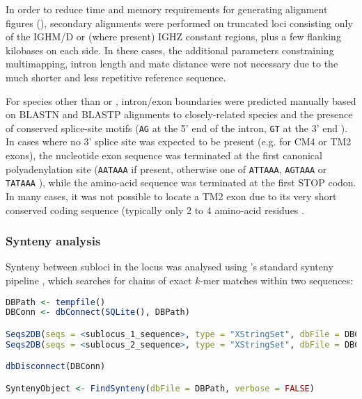 In order to reduce time and memory requirements for generating alignment figures (), secondary alignments were performed on truncated loci consisting only of the IGHM/D or (where present) IGHZ constant regions, plus a few flanking kilobases on each side. In these cases, the additional parameters constraining multimapping, intron length and mate distance were not necessary due to the much shorter and less repetitive reference sequence.

For species other than \Nfu or \Xma, intron/exon boundaries were predicted manually based on BLASTN and BLASTP alignments to closely-related species and the presence of conserved splice-site motifs (\texttt{AG} at the 5' end of the intron, \texttt{GT} at the 3' end \parencite{shapiro1987splice}). In cases where no 3' splice site was expected to be present (e.g. for CM4 or TM2 exons), the nucleotide exon sequence was terminated at the first canonical polyadenylation site (\texttt{AATAAA} if present, otherwise one of \texttt{ATTAAA}, \texttt{AGTAAA} or \texttt{TATAAA} \parencite{ulitsky2012polya}), while the amino-acid sequence was terminated at the first STOP codon. In many cases, it was not possible to locate a TM2 exon due to its very short conserved coding sequence (typically only 2 to 4 amino-acid residues \parencite{bao2010stickleback,danilova2005zebrafish}.

\subsubsection{Synteny analysis}
\label{sec:methods_comp_locus_synteny}

Synteny between subloci in the \Nfu locus was analysed using 's standard synteny pipeline \parencite{wright2016decipher}, which searches for chains of exact $k$-mer matches within two sequences:

\begin{lstlisting}[language=R]
DBPath <- tempfile()
DBConn <- dbConnect(SQLite(), DBPath)

Seqs2DB(seqs = <sublocus_1_sequence>, type = "XStringSet", dbFile = DBConn, identifier = "IGH1", verbose = FALSE)
Seqs2DB(seqs = <sublocus_2_sequence>, type = "XStringSet", dbFile = DBConn, identifier = "IGH2", verbose = FALSE)

dbDisconnect(DBConn)

SyntenyObject <- FindSynteny(dbFile = DBPath, verbose = FALSE)
\end{lstlisting}

